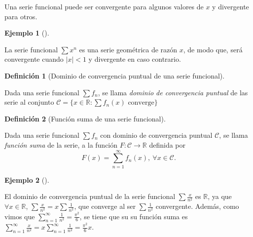 \documentclass[
  a4paper,
]{scrreport}
\theoremstyle{plain}
\theoremstyle{plain}
\theoremstyle{definition}
\newtheorem{definition}{Definición}[chapter]
\theoremstyle{definition}
\newtheorem{example}{Ejemplo}[chapter]
\theoremstyle{plain}
\theoremstyle{remark}
\begin{document}
Una serie funcional puede ser convergente para algunos valores de \(x\)
y divergente para otros.

\leavevmode{}%
\begin{example}[]\label{exm-convergencia-puntual}

La serie funcional \(\sum x^n\) es una serie geométrica de razón \(x\),
de modo que, será convergente cuando \(|x|<1\) y divergente en caso
contrario.

\end{example}

\leavevmode{}%
\begin{definition}[Dominio de convergencia puntual de una serie
funcional]\label{def-dominio-convergencia-puntual-serie-funcional}

Dada una serie funcional \(\sum f_n\), se llama \emph{dominio de
convergencia puntual} de las serie al conjunto
\(\mathcal{C}=\{x\in\mathbb{R}: \sum f_n(x) \mbox{ converge}\}\)

\end{definition}

\leavevmode{}%
\begin{definition}[Función suma de una serie
funcional]\label{def-funcion-suma}

Dada una serie funcional \(\sum f_n\) con dominio de convergencia
puntual \(\mathcal{C}\), se llama \emph{función suma} de la serie, a la
función \(F:\mathcal{C}\to\mathbb{R}\) definida por \[
F(x) = \sum_{n=1}^\infty f_n(x),\ \forall x\in \mathcal{C}.
\]

\end{definition}

\leavevmode{}%
\begin{example}[]\label{exm-funcion-suma}

El dominio de convergencia puntual de la serie funcional
\(\sum \frac{x}{n^2}\) es \(\mathbb{R}\), ya que
\(\forall x\in\mathbb{R}\), \(\sum \frac{x}{n^2}=x\sum\frac{1}{n^2}\),
que converge al ser \(\sum \frac{1}{n^2}\) convergente. Además, como
vimos que \(\sum_{n=1}^\infty \frac{1}{n^2}=\frac{\pi^2}{6}\), se tiene
que su su función suma es
\(\sum_{n=1}^\infty \frac{x}{n^2} = x\sum_{n=1}^\infty \frac{1}{n^2}= \frac{\pi^2}{6}x\).

\end{example}
\end{document}
